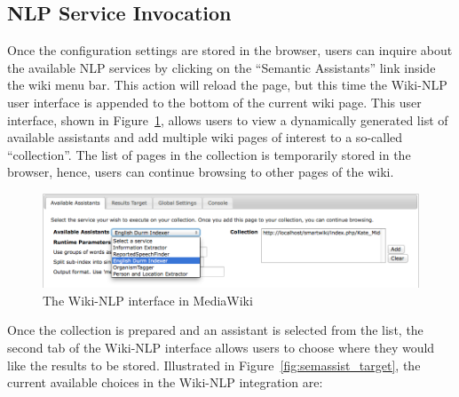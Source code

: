 \subsection{NLP Service Invocation}
Once the configuration settings are stored in the browser, users can inquire about the available NLP services by clicking on the ``Semantic Assistants'' link inside the wiki menu bar. This action will reload the page, but this time the Wiki-NLP user interface is appended to the bottom of the current wiki page. This user interface, shown in Figure~\ref{fig:semassist_ui}, allows users to view a dynamically generated list of available assistants and add multiple wiki pages of interest to a so-called ``collection''. The list of pages in the collection is temporarily stored in the browser, hence, users can continue browsing to other pages of the wiki.

\begin{figure}
\centering
\includegraphics[width=\textwidth]{pictures/semassist_ui.png}
\caption{The Wiki-NLP interface in MediaWiki}
\label{fig:semassist_ui}
\end{figure}

\blankline
Once the collection is prepared and an assistant is selected from the list, the second tab of the Wiki-NLP interface allows users to choose where they would like the results to be stored. Illustrated in Figure~\ref{fig:semassist_target}, the current available choices in the Wiki-NLP integration are:


